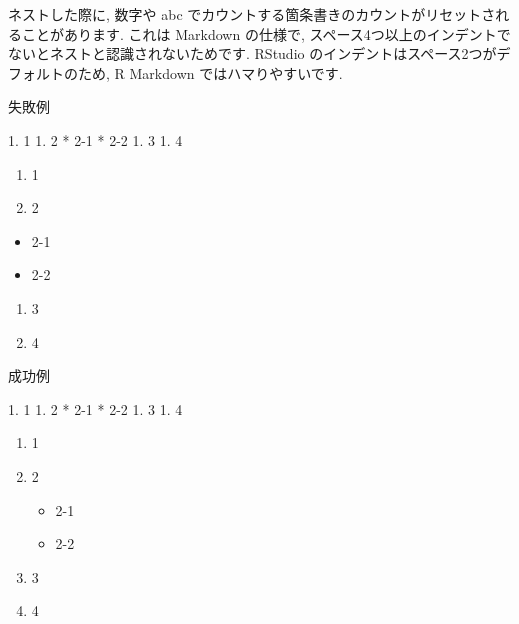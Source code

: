 \documentclass[
]{bxjsarticle}
\newenvironment{Shaded}{\begin{snugshade}}{\end{snugshade}}
\newcommand{\NormalTok}[1]{#1}
\newcommand{\SpecialStringTok}[1]{\textcolor[rgb]{0.31,0.60,0.02}{#1}}
\providecommand{\tightlist}{%
  \setlength{\itemsep}{0pt}\setlength{\parskip}{0pt}}
\begin{document}
ネストした際に, 数字や abc でカウントする箇条書きのカウントがリセットされることがあります. これは Markdown の仕様で, スペース4つ以上のインデントでないとネストと認識されないためです. RStudio のインデントはスペース2つがデフォルトのため, R Markdown ではハマりやすいです.

失敗例

\begin{Shaded}
\begin{Highlighting}[]
\SpecialStringTok{1. }\NormalTok{1}
\SpecialStringTok{1. }\NormalTok{2}
\SpecialStringTok{  * }\NormalTok{2{-}1}
\SpecialStringTok{  * }\NormalTok{2{-}2}
\SpecialStringTok{1. }\NormalTok{3}
\SpecialStringTok{1. }\NormalTok{4}
\end{Highlighting}
\end{Shaded}

\begin{enumerate}
\def\labelenumi{\arabic{enumi}.}
\tightlist
\item
  1
\item
  2
\end{enumerate}

\begin{itemize}
\tightlist
\item
  2-1
\item
  2-2
\end{itemize}

\begin{enumerate}
\def\labelenumi{\arabic{enumi}.}
\tightlist
\item
  3
\item
  4
\end{enumerate}

成功例

\begin{Shaded}
\begin{Highlighting}[]
\SpecialStringTok{1. }\NormalTok{1}
\SpecialStringTok{1. }\NormalTok{2}
\SpecialStringTok{    * }\NormalTok{2{-}1}
\SpecialStringTok{    * }\NormalTok{2{-}2}
\SpecialStringTok{1. }\NormalTok{3}
\SpecialStringTok{1. }\NormalTok{4}
\end{Highlighting}
\end{Shaded}

\begin{enumerate}
\def\labelenumi{\arabic{enumi}.}
\tightlist
\item
  1
\item
  2

  \begin{itemize}
  \tightlist
  \item
    2-1
  \item
    2-2
  \end{itemize}
\item
  3
\item
  4
\end{enumerate}
\end{document}

